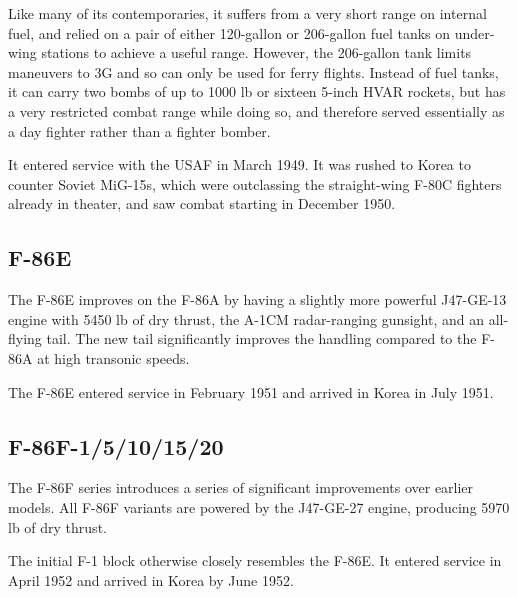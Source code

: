 Like many of its contemporaries, it suffers from a very short range on internal fuel, and relied on a pair of either 120-gallon or 206-gallon fuel tanks on under-wing stations to achieve a useful range. However, the 206-gallon tank limits maneuvers to 3G and so can only be used for ferry flights. Instead of fuel tanks, it can carry two bombs of up to 1000 lb or sixteen 5-inch HVAR rockets, but has a very restricted combat range while doing so, and therefore served essentially as a day fighter rather than a fighter bomber.

It entered service with the USAF in March 1949. It was rushed to Korea to counter Soviet MiG-15s, which were outclassing the straight-wing F-80C fighters already in theater, and saw combat starting in December 1950.

\subsection{F-86E}

The F-86E improves on the F-86A by having a slightly more powerful J47-GE-13 engine with 5450 lb of dry thrust, the A-1CM radar-ranging gunsight, and an all-flying tail. The new tail significantly improves the handling compared to the F-86A at high transonic speeds.%

The F-86E entered service in February 1951 and arrived in Korea in July 1951.

\subsection{F-86F-1/5/10/15/20}

The F-86F series introduces a series of significant improvements over earlier models. All F-86F variants are powered by the J47-GE-27 engine, producing 5970 lb of dry thrust.%

The initial F-1 block otherwise closely resembles the F-86E. It entered service in April 1952 and arrived in Korea by June 1952.%

